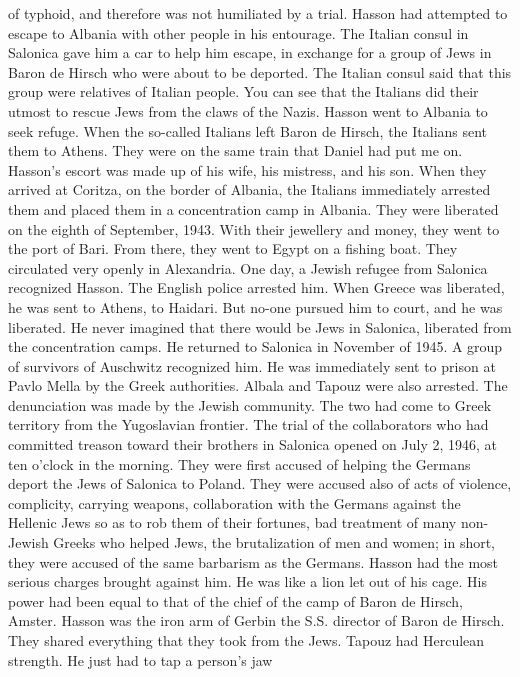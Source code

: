 of typhoid, and therefore was not humiliated by a trial.
Hasson had attempted to escape to Albania with other people in his 
entourage.
The Italian consul in Salonica gave him a car to help him escape, in exchange for a group of Jews in Baron de Hirsch who were about to be deported.
The Italian consul said that this group were relatives of Italian people.
You can see that the Italians did their 
utmost to rescue Jews from the claws of the Nazis.
Hasson went to Albania to seek refuge.
When the so-called Italians 
left Baron de Hirsch, the Italians sent them to Athens.
They were on the 
same train that Daniel had put me on.
Hasson's escort was made up of his wife, his mistress, and his son.
When they arrived at Coritza, on the border of Albania, the Italians immediately arrested them and placed them in a concentration camp in Albania.
They were liberated on the eighth of September, 1943.
With their 
jewellery and money, they went to the port of Bari.
From there, they 
went to Egypt on a fishing boat.
They circulated very openly in Alexandria.
One day, a Jewish refugee from Salonica recognized Hasson.
The English police arrested him.
When Greece was liberated, he was sent to Athens, to Haidari.
But no-one pursued him to court, and he was liberated.
He never imagined that there would be Jews in Salonica, liberated 
from the concentration camps.
He returned to Salonica in November of 
1945.
A group of survivors of Auschwitz recognized him.
He was immediately sent to prison at Pavlo Mella by the Greek authorities.
Albala and Tapouz were also arrested.
The denunciation was made by 
the Jewish community.
The two had come to Greek territory from the Yugoslavian frontier.
The trial of the collaborators who had committed treason toward 
their brothers in Salonica opened on July 2, 1946, at ten o'clock in the 
morning.
They were first accused of helping the Germans deport the Jews 
of Salonica to Poland.
They were accused also of acts of violence, complicity, carrying weapons, collaboration with the Germans against the 
Hellenic Jews so as to rob them of their fortunes, bad treatment of many 
non-Jewish Greeks who helped Jews, the brutalization of men and women; 
in short, they were accused of the same barbarism as the Germans.
Hasson had the most serious charges brought against him.
He was like a lion let out of his cage.
His power had been equal to that of the chief of
the camp of Baron de Hirsch, Amster.
Hasson was the iron arm of Gerbin 
the S.S.
director of Baron de Hirsch.
They shared everything that they 
took from the Jews.
Tapouz had Herculean strength.
He just had to tap a person's jaw 
